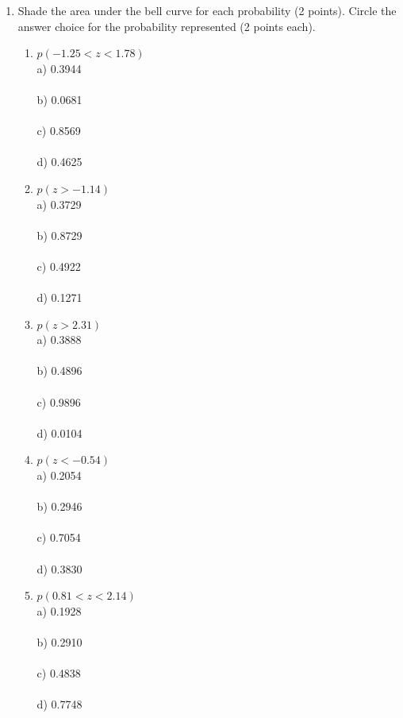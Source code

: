 \documentclass[12pt]{article}
\begin{document}
\begin{enumerate}
\item Shade the area under the bell curve for each probability (2 points).  Circle the answer choice for the probability represented (2 points each).
\begin{enumerate}
\item $p(-1.25<z<1.78)$
\vspace{.75 in}
\\ a) 0.3944
\\
\\ b) 0.0681
\\
\\ c) 0.8569
\\
\\ d) 0.4625
\\
\item $p(z>-1.14)$
\vspace{1.0 in}
\\ a) 0.3729
\\
\\ b) 0.8729
\\
\\ c) 0.4922
\\
\\ d) 0.1271
\\
\item $p(z>2.31)$
\vspace{1.0 in}
\\ a) 0.3888
\\
\\ b) 0.4896
\\
\\ c) 0.9896
\\
\\ d) 0.0104
\\
\item $p(z<-0.54)$
\vspace{1.0 in}
\\ a) 0.2054
\\
\\ b) 0.2946
\\
\\ c) 0.7054
\\
\\ d) 0.3830
\\
\item $p(0.81<z<2.14)$
\vspace{1.0 in}
\\ a) 0.1928
\\
\\ b) 0.2910
\\
\\ c) 0.4838
\\
\\ d) 0.7748
\\
\end{enumerate}




\end{enumerate}
\end{document}
